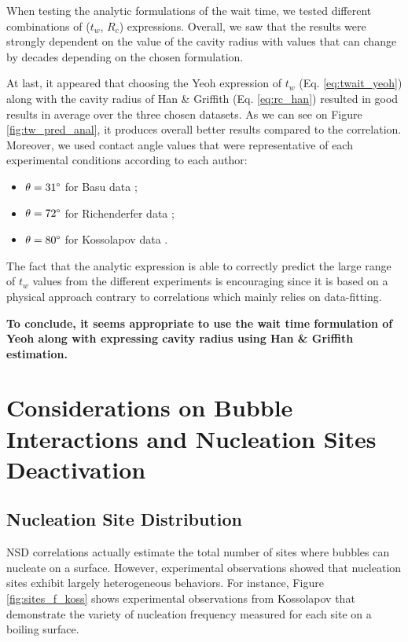 \npar
When testing the analytic formulations of the wait time, we tested different combinations of ($t_{w}$, $R_{c}$) expressions. Overall, we saw that the results were strongly dependent on the value of the cavity radius with values that can change by decades depending on the chosen formulation.

\npar
At last, it appeared that choosing the Yeoh \etal expression of $t_{w}$ (Eq. \ref{eq:twait_yeoh}) along with the cavity radius of Han \& Griffith (Eq. \ref{eq:rc_han}) resulted in good results in average over the three chosen datasets. As we can see on Figure \ref{fig:tw_pred_anal}, it produces overall better results compared to the correlation. Moreover, we used contact angle values that were representative of each experimental conditions according to each author:

\begin{itemize}
\item $\theta = 31 \degree$ for Basu \etal data \cite{basu_wall_2005-1} ;
\item $\theta = 72 \degree$ for Richenderfer data \cite{richenderfer_experimental_2018};
\item $\theta = 80 \degree$ for Kossolapov data \cite{kossolapov_experimental_2021}.
\end{itemize} 

The fact that the analytic expression is able to correctly predict the large range of $t_{w}$ values from the different experiments is encouraging since it is based on a physical approach contrary to correlations which mainly relies on data-fitting.

\npar
\textbf{To conclude, it seems appropriate to use the wait time formulation of Yeoh \etal along with expressing cavity radius using Han \& Griffith estimation.}


\section{Considerations on Bubble Interactions and Nucleation Sites Deactivation}
\label{sec:site_interactions}

\subsection{Nucleation Site Distribution}

NSD correlations actually estimate the total number of sites where bubbles can nucleate on a surface. However, experimental observations showed that nucleation sites exhibit largely heterogeneous behaviors. For instance, Figure \ref{fig:sites_f_koss} shows experimental observations from Kossolapov \cite{kossolapov_experimental_2021} that demonstrate the variety of nucleation frequency measured for each site on a boiling surface.

